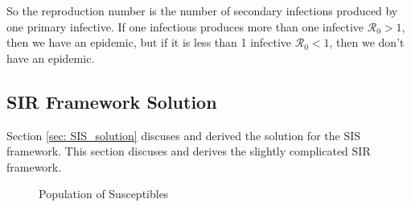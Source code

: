 \documentclass[fontsize=17pt]{article}
\begin{document}
So the reproduction number is the number of secondary infections produced by one primary infective. If one infectious produces more than one infective $\mathscr{R}_{0}>1$, then we have an epidemic, but if it is less than 1 infective $\mathscr{R}_{0}<1$, then we don't have an epidemic.

\subsection{SIR Framework Solution}
Section \ref{sec: SIS_solution} discuses and derived the solution for the SIS framework. This section discuses and derives the slightly complicated SIR framework. 
\begin{figure}
	\begin{center}
	\end{center}
	\caption{Population of Susceptibles}
	\label{fig: full_population}
\end{figure}
\end{document}

